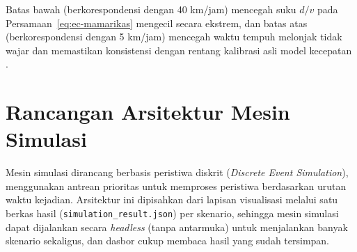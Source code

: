 Batas bawah (berkorespondensi dengan 40 km/jam) mencegah suku $d/v$ pada Persamaan~\ref{eq:ec-mamarikas} mengecil secara ekstrem, dan batas atas (berkorespondensi dengan 5 km/jam) mencegah waktu tempuh melonjak tidak wajar dan memastikan konsistensi dengan rentang kalibrasi asli model kecepatan \autocite{mamarikas2025}.

\section{Rancangan Arsitektur Mesin Simulasi}

Mesin simulasi dirancang berbasis peristiwa diskrit (\textit{Discrete Event
	Simulation}), menggunakan antrean prioritas untuk memproses peristiwa
berdasarkan urutan waktu kejadian. Arsitektur ini dipisahkan dari lapisan
visualisasi melalui satu berkas hasil (\texttt{simulation\_result.json})
per skenario, sehingga mesin simulasi dapat dijalankan secara
\textit{headless} (tanpa antarmuka) untuk menjalankan banyak skenario
sekaligus, dan dasbor cukup membaca hasil yang sudah tersimpan.

